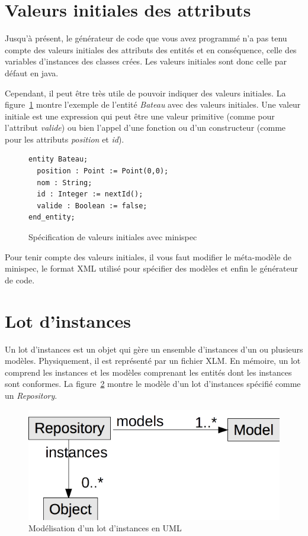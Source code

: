 \documentclass[12pt]{article}
\begin{document}
\section{Valeurs initiales des attributs}
Jusqu'à présent, le générateur de code que vous avez programmé n'a pas tenu compte des valeurs initiales des attributs des entités et en conséquence, celle des variables d'instances des classes crées. Les valeurs initiales sont donc celle par défaut en java. 

Cependant, il peut être très utile de pouvoir indiquer des valeurs initiales. La figure~\ref{fig:exemple-minispec7} montre l'exemple de l'entité \textit{Bateau} avec des valeurs initiales. Une valeur initiale est une expression qui peut être une valeur primitive  (comme pour l'attribut \textit{valide}) ou bien l'appel d'une fonction ou d'un constructeur (comme pour les attributs \textit{position} et \textit{id}).
\begin{figure}
\begin{lstlisting}[language=express]
entity Bateau;
  position : Point := Point(0,0);
  nom : String;
  id : Integer := nextId();
  valide : Boolean := false;
end_entity;
\end{lstlisting}
\caption{Spécification de valeurs initiales avec minispec}
\label{fig:exemple-minispec7}
\end{figure} 

Pour tenir compte des valeurs initiales, il vous faut modifier le méta-modèle de minispec, le format XML utilisé pour spécifier des modèles et enfin le générateur de code.

\section{Lot d'instances}
Un lot d'instances est un objet qui gère un ensemble d'instances d'un ou plusieurs modèles. Physiquement, il est représenté par un fichier XLM. En mémoire, un lot comprend les instances et les modèles comprenant les entités dont les instances sont conformes. La figure~\ref{fig:repository-UML1}  montre le modèle d'un lot d'instances spécifié comme un \textit{Repository}.

\begin{figure}
\begin{center}
\includegraphics[scale=0.5]{repositoryUML1.png}
\end{center}
\caption{Modélisation d'un lot d'instances en UML}
\label{fig:repository-UML1}
\end{figure}
\end{document}
